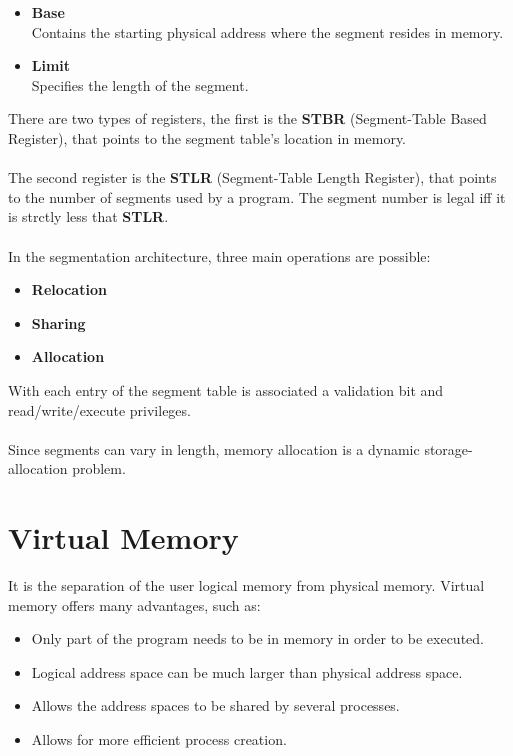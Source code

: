 \documentclass{article}
\begin{document}
\begin{itemize}
	\item \textbf{Base}
	\vspace{.2cm} \\
	Contains the starting physical address where the segment resides in memory.
	
	\item \textbf{Limit}
	\vspace{.2cm} \\
	Specifies the length of the segment.
\end{itemize}
There are two types of registers, the first is the \textbf{STBR} (Segment-Table Based Register), that points to the segment table's location in memory. \\ \\
The second register is the \textbf{STLR} (Segment-Table Length Register), that points to the number of segments used by a program. The segment number is legal iff it is strctly less that \textbf{STLR}. \\ \\
In the segmentation architecture, three main operations are possible:

\begin{itemize}
	\item \textbf{Relocation}
	\item \textbf{Sharing}
	\item \textbf{Allocation}
\end{itemize}
With each entry of the segment table is associated a validation bit and read/write/execute privileges. \\ \\
Since segments can vary in length, memory allocation is a dynamic storage-allocation problem.

\section{Virtual Memory}
It is the separation of the user logical memory from physical memory. Virtual memory offers many advantages, such as:

\begin{itemize}
	\item Only part of the program needs to be in memory in order to be executed.
	\item Logical address space can be much larger than physical address space.
	\item Allows the address spaces to be shared by several processes.
	\item Allows for more efficient process creation.
\end{itemize}
\end{document}
